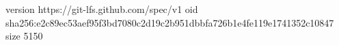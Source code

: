 version https://git-lfs.github.com/spec/v1
oid sha256:e2c89ec53aef95f3bd7080c2d19c2b951dbbfa726b1e4fe119e1741352c10847
size 5150
